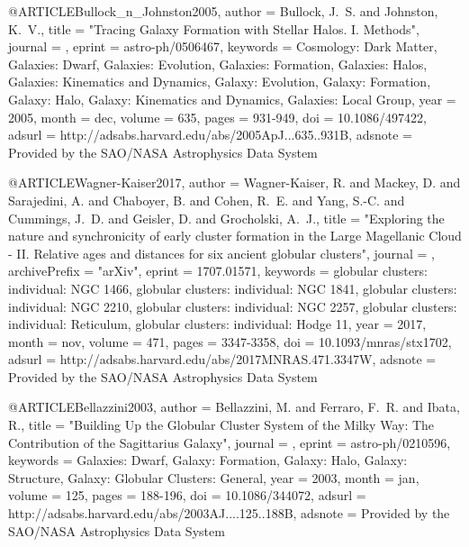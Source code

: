 \documentclass[apj]{emulateapj}
\begin{document}
{{{{{{{{{{{{{{{@ARTICLE{Bullock_n_Johnston2005,
   author = {{Bullock}, J.~S. and {Johnston}, K.~V.},
    title = "{Tracing Galaxy Formation with Stellar Halos. I. Methods}",
  journal = {\apj},
   eprint = {astro-ph/0506467},
 keywords = {Cosmology: Dark Matter, Galaxies: Dwarf, Galaxies: Evolution, Galaxies: Formation, Galaxies: Halos, Galaxies: Kinematics and Dynamics, Galaxy: Evolution, Galaxy: Formation, Galaxy: Halo, Galaxy: Kinematics and Dynamics, Galaxies: Local Group},
     year = 2005,
    month = dec,
   volume = 635,
    pages = {931-949},
      doi = {10.1086/497422},
   adsurl = {http://adsabs.harvard.edu/abs/2005ApJ...635..931B},
  adsnote = {Provided by the SAO/NASA Astrophysics Data System}
}

@ARTICLE{Wagner-Kaiser2017,
   author = {{Wagner-Kaiser}, R. and {Mackey}, D. and {Sarajedini}, A. and 
	{Chaboyer}, B. and {Cohen}, R.~E. and {Yang}, S.-C. and {Cummings}, J.~D. and 
	{Geisler}, D. and {Grocholski}, A.~J.},
    title = "{Exploring the nature and synchronicity of early cluster formation in the Large Magellanic Cloud - II. Relative ages and distances for six ancient globular clusters}",
  journal = {\mnras},
archivePrefix = "arXiv",
   eprint = {1707.01571},
 keywords = {globular clusters: individual: NGC 1466, globular clusters: individual: NGC 1841, globular clusters: individual: NGC 2210, globular clusters: individual: NGC 2257, globular clusters: individual: Reticulum, globular clusters: individual: Hodge 11},
     year = 2017,
    month = nov,
   volume = 471,
    pages = {3347-3358},
      doi = {10.1093/mnras/stx1702},
   adsurl = {http://adsabs.harvard.edu/abs/2017MNRAS.471.3347W},
  adsnote = {Provided by the SAO/NASA Astrophysics Data System}
}



@ARTICLE{Bellazzini2003,
   author = {{Bellazzini}, M. and {Ferraro}, F.~R. and {Ibata}, R.},
    title = "{Building Up the Globular Cluster System of the Milky Way: The Contribution of the Sagittarius Galaxy}",
  journal = {\aj},
   eprint = {astro-ph/0210596},
 keywords = {Galaxies: Dwarf, Galaxy: Formation, Galaxy: Halo, Galaxy: Structure, Galaxy: Globular Clusters: General},
     year = 2003,
    month = jan,
   volume = 125,
    pages = {188-196},
      doi = {10.1086/344072},
   adsurl = {http://adsabs.harvard.edu/abs/2003AJ....125..188B},
  adsnote = {Provided by the SAO/NASA Astrophysics Data System}
}




}}}}}}}}}}}}}}}
\end{document}
